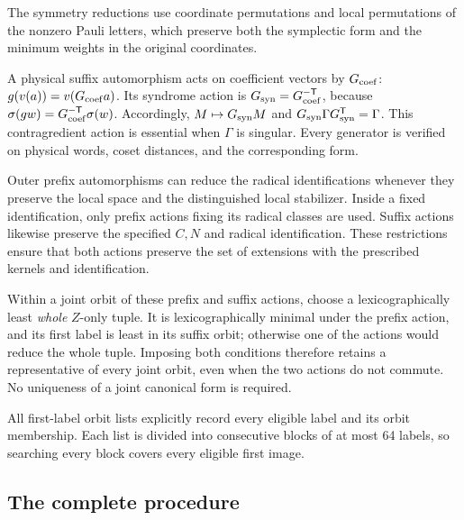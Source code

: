 \documentclass[11pt]{article}
\theoremstyle{definition}
\theoremstyle{remark}
\newcommand{\tr}{\mathsf T}
\begin{document}
The symmetry reductions use coordinate permutations and local
permutations of the nonzero Pauli letters, which preserve both the
symplectic form and the minimum weights in the original coordinates.

A physical suffix automorphism acts on coefficient vectors by
\(G_{\rm coef}\): \(g(v(a))=v(G_{\rm coef}a)\). Its syndrome action is
\(G_{\rm syn}=G_{\rm coef}^{-\tr}\), because
\(\sigma(gw)=G_{\rm coef}^{-\tr}\sigma(w)\). Accordingly,
\(M\mapsto G_{\rm syn}M\) and \(G_{\rm syn}\Gamma G_{\rm syn}^\tr=\Gamma\).
This contragredient action is essential when \(\Gamma\) is singular.
Every generator is verified on physical words, coset distances, and the
corresponding form.

Outer prefix automorphisms can reduce the radical identifications
whenever they preserve the local space and the distinguished local
stabilizer. Inside a fixed identification, only prefix actions fixing
its radical classes are used. Suffix actions likewise preserve the
specified \(C,N\) and radical identification. These restrictions ensure
that both actions preserve the set of extensions with the prescribed
kernels and identification.

Within a joint orbit of these prefix and suffix actions, choose a
lexicographically least \emph{whole} \(Z\)-only tuple. It is
lexicographically minimal under the prefix action, and its first label
is least in its suffix orbit; otherwise one of the actions would reduce
the whole tuple. Imposing both conditions therefore retains a
representative of every joint orbit, even when the two actions do not
commute. No uniqueness of a joint canonical form is required.

All first-label orbit lists explicitly record every eligible label and
its orbit membership. Each list is divided into consecutive blocks of at
most 64 labels, so searching every block covers every eligible first
image.

\subsection{The complete procedure}\label{sec:procedure}
\end{document}

